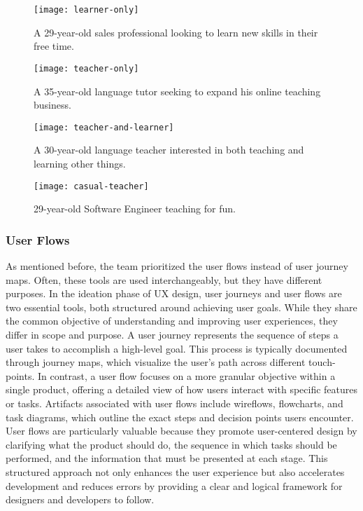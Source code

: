 \begin{figure}[h]
    \centering
    \texttt{[image: learner-only]}
    \caption{A 29-year-old sales professional looking to learn new skills in their free time.}
    \label{fig:figure14}
\end{figure}
\begin{figure}[t]
    \centering
    \texttt{[image: teacher-only]}
    \caption{A 35-year-old language tutor seeking to expand his online teaching business.}
    \label{fig:figure15}
\end{figure}
\begin{figure}[h]
    \centering
    \texttt{[image: teacher-and-learner]}
    \caption{A 30-year-old language teacher interested in both teaching and learning other things.}
    \label{fig:figure16}
\end{figure}
\begin{figure}[b]
    \centering
    \texttt{[image: casual-teacher]}
    \caption{ 29-year-old Software Engineer teaching for fun.}
    \label{fig:figure17}
\end{figure}

\clearpage

\subsubsection{User Flows}\label{subsubsec:user-flows}
As mentioned before, the team prioritized the user flows instead of user journey maps.
Often, these tools are used interchangeably, but they have different purposes.
In the ideation phase of UX design, user journeys and user flows are two essential tools, both structured around achieving user goals.
While they share the common objective of understanding and improving user experiences, they differ in scope and purpose.
A user journey represents the sequence of steps a user takes to accomplish a high-level goal.
This process is typically documented through journey maps, which visualize the user's path across different touch-points.
In contrast, a user flow focuses on a more granular objective within a single product, offering a detailed view of how users interact with specific features or tasks.
Artifacts associated with user flows include wireflows, flowcharts, and task diagrams, which outline the exact steps and decision points users encounter.\newline
User flows are particularly valuable because they promote user-centered design by clarifying what the product should do, the sequence in which tasks should be performed, and the information that must be presented at each stage.
This structured approach not only enhances the user experience but also accelerates development and reduces errors by providing a clear and logical framework for designers and developers to follow.\cite[User Journeys vs User Flows]{userJourneys}

